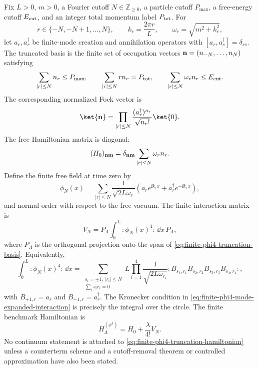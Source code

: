 \begin{construction}
\label{con:finite-normal-ordered-phi4-truncation}
Fix \(L>0\), \(m>0\), a Fourier cutoff \(N\in\mathbb Z_{\geq0}\), a particle
cutoff \(P_{\max}\), a free-energy cutoff \(E_{\rm cut}\), and an integer
total momentum label \(P_{\rm tot}\).  For
\[
  r\in\{-N,-N+1,\ldots,N\},
  \qquad
  k_r=\frac{2\pi r}{L},
  \qquad
  \omega_r=\sqrt{m^2+k_r^2},
\]
let \(a_r,a_r^\dagger\) be finite-mode creation and annihilation operators
with \([a_r,a_s^\dagger]=\delta_{rs}\).  The truncated basis is the finite
set of occupation vectors \({\bf n}=(n_{-N},\ldots,n_N)\) satisfying
\begin{equation}
  \sum_{|r|\leq N}n_r\leq P_{\max},
  \qquad
  \sum_{|r|\leq N}r n_r=P_{\rm tot},
  \qquad
  \sum_{|r|\leq N}\omega_r n_r\leq E_{\rm cut}.
  \label{eq:finite-phi4-truncation-basis}
\end{equation}
The corresponding normalized Fock vector is
\[
  \ket{\bf n}
  =
  \prod_{|r|\leq N}\frac{(a_r^\dagger)^{n_r}}{\sqrt{n_r!}}\ket{0}.
\]
The free Hamiltonian matrix is diagonal:
\[
  (H_0)_{{\bf n}{\bf m}}
  =
  \delta_{{\bf n}{\bf m}}
  \sum_{|r|\leq N}\omega_r n_r .
\]
Define the finite free field at time zero by
\[
  \phi_N(x)
  =
  \sum_{|r|\leq N}
  \frac{1}{\sqrt{2L\omega_r}}
  \left(a_r e^{\ii k_r x}+a_r^\dagger e^{-\ii k_r x}\right),
\]
and normal order with respect to the free vacuum.  The finite interaction
matrix is
\begin{equation}
  V_N
  =
  P_{\Lambda}
  \int_0^L:\phi_N(x)^4:\,\dd x\,
  P_{\Lambda},
  \label{eq:finite-phi4-normal-ordered-interaction}
\end{equation}
where \(P_\Lambda\) is the orthogonal projection onto the span of
\eqref{eq:finite-phi4-truncation-basis}.  Equivalently,
\begin{equation}
  \int_0^L:\phi_N(x)^4:\,\dd x
  =
  \sum_{\substack{s_i=\pm1,\ |r_i|\leq N\\
        \sum_i s_i r_i=0}}
  L\prod_{i=1}^4\frac{1}{\sqrt{2L\omega_{r_i}}}
  :B_{s_1,r_1}B_{s_2,r_2}B_{s_3,r_3}B_{s_4,r_4}: ,
  \label{eq:finite-phi4-mode-expanded-interaction}
\end{equation}
with \(B_{+1,r}=a_r\) and \(B_{-1,r}=a_r^\dagger\).  The Kronecker
condition in \eqref{eq:finite-phi4-mode-expanded-interaction} is precisely
the integral over the circle.  The finite benchmark Hamiltonian is
\begin{equation}
  H_\Lambda^{(\phi^4)}
  =
  H_0+\frac{\lambda}{4!}V_N .
  \label{eq:finite-phi4-truncation-hamiltonian}
\end{equation}
No continuum statement is attached to
\eqref{eq:finite-phi4-truncation-hamiltonian} unless a counterterm scheme and
a cutoff-removal theorem or controlled approximation have also been stated.
\end{construction}

